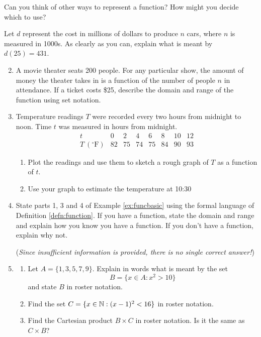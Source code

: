 Can you think of other ways to represent a function? How might you decide which to use?


\goodbreak


\begin{exercises}{}{}
	\exstart Let $d$ represent the cost in millions of dollars to produce $n$ cars, where $n$ is measured in 1000s. As clearly as you can, explain what is meant by $d(25)=431$. 

	\begin{enumerate}\setcounter{enumi}{1}
	  \item A movie theater seats 200 people. For any particular show, the amount of money the theater takes in is a function of the number of people $n$ in attendance. If a ticket costs \$25, describe the domain and range of the function using set notation.
	  
	  
		\item\label{exs:templinear} Temperature readings $T$ were recorded every two hours from midnight to noon. Time $t$ was measured in hours from midnight.
	  \[
	  	\begin{array}{l|ccccccc}
	  		t&0&2&4&6&8&10&12\\\hline
	  		T\ (^\circ\mathrm{F})&82&75&74&75&84&90&93
	  	\end{array}
	  \]
	  \begin{enumerate}
	    \item Plot the readings and use them to sketch a rough graph of $T$ as a function of $t$.
	    \item Use your graph to estimate the temperature at 10:30\AM
	  \end{enumerate}
	  
	  
	  \item State parts 1, 3 and 4 of Example \ref{ex:funcbasic} using the formal language of Definition \ref{defn:function}. If you have a function, state the domain and range and explain how you know you have a function. If you don't have a function, explain why not.
	  \par
	  (\emph{Since insufficient information is provided, there is no single correct answer!})
	  
	  
	  \item\begin{enumerate}
	    \item Let $A=\{1,3,5,7,9\}$. Explain in words what is meant by the set
	    \[
	    	B=\{x\in A:x^2>10\}
	    \]
	    and state $B$ in roster notation.
	    \item Find the set $C=\{x\in\mathbb{N}:(x-1)^2<16\}$ in roster notation.
	    \item Find the Cartesian product $B\times C$ in roster notation. Is it the same as $C\times B$?
	  \end{enumerate}
	  

\end{enumerate}
\end{exercises}
